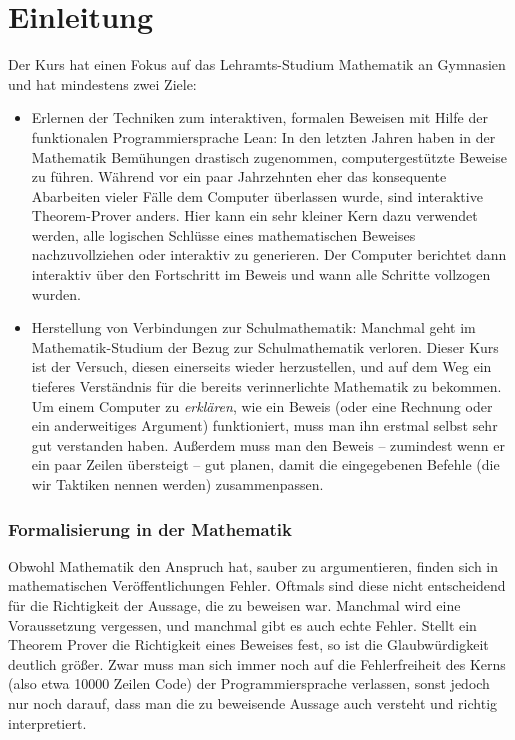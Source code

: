 \documentclass[11pt]{article}
\begin{document}
\section{Einleitung}
Der Kurs hat einen Fokus auf das Lehramts-Studium Mathematik an Gymnasien und hat mindestens zwei Ziele:
\begin{itemize}
\item \sloppy Erlernen der Techniken zum interaktiven, formalen Beweisen mit Hilfe der funktionalen Programmiersprache Lean: In den letzten Jahren haben in der Mathematik Bemühungen drastisch zugenommen, computergestützte Beweise zu führen. Während vor ein paar Jahrzehnten eher das konsequente Abarbeiten vieler Fälle dem Computer überlassen wurde, sind interaktive Theorem-Prover anders. Hier kann ein sehr kleiner Kern dazu verwendet werden, alle logischen Schlüsse eines mathematischen Beweises nachzuvollziehen oder interaktiv zu generieren. Der Computer berichtet dann interaktiv über den Fortschritt im Beweis und wann alle Schritte vollzogen wurden. 
\item Herstellung von Verbindungen zur Schulmathematik: Manchmal geht im Mathematik-Studium der Bezug zur Schulmathematik verloren. Dieser Kurs ist der Versuch, diesen einerseits wieder herzustellen, und auf dem Weg ein tieferes Verständnis für die bereits verinnerlichte Mathematik zu bekommen. Um einem Computer zu {\it erklären}, wie ein Beweis (oder eine Rechnung oder ein anderweitiges Argument) funktioniert, muss man ihn erstmal selbst sehr gut verstanden haben. Außerdem muss man den Beweis -- zumindest wenn er ein paar Zeilen übersteigt -- gut planen, damit die eingegebenen Befehle (die wir Taktiken nennen werden) zusammenpassen.
\end{itemize}

\subsubsection*{Formalisierung in der Mathematik}
\sloppy Obwohl Mathematik den Anspruch hat, sauber zu argumentieren, finden sich in mathematischen Veröffentlichungen Fehler. Oftmals sind diese nicht entscheidend für die Richtigkeit der Aussage, die zu beweisen war. Manchmal wird eine Voraussetzung vergessen, und manchmal gibt es auch echte Fehler. Stellt ein Theorem Prover die Richtigkeit eines Beweises fest, so ist die Glaubwürdigkeit deutlich größer. Zwar muss man sich immer noch auf die Fehlerfreiheit des Kerns (also etwa 10000 Zeilen Code) der Programmiersprache verlassen, sonst jedoch nur noch darauf, dass man die zu beweisende Aussage auch versteht und richtig interpretiert. 
\end{document}
